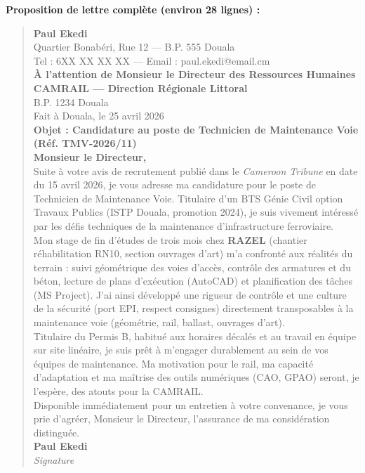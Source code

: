 \documentclass[11pt]{article}
\begin{document}
\begin{corrige}
\textbf{Proposition de lettre complète (environ 28 lignes) :}
\begin{quote}
\textbf{Paul Ekedi} \\
Quartier Bonabéri, Rue 12 — B.P. 555 Douala \\
Tel : 6XX XX XX XX — Email : paul.ekedi@email.cm \\[0.5em]
\textbf{À l'attention de Monsieur le Directeur des Ressources Humaines} \\
\textbf{CAMRAIL — Direction Régionale Littoral} \\
B.P. 1234 Douala \\[0.5em]
Fait à Douala, le 25 avril 2026 \\[0.5em]
\textbf{Objet : Candidature au poste de Technicien de Maintenance Voie (Réf. TMV-2026/11)} \\[0.5em]
\textbf{Monsieur le Directeur,} \\[0.5em]
Suite à votre avis de recrutement publié dans le \emph{Cameroon Tribune} en date du 15 avril 2026, je vous adresse ma candidature pour le poste de Technicien de Maintenance Voie. Titulaire d'un BTS Génie Civil option Travaux Publics (ISTP Douala, promotion 2024), je suis vivement intéressé par les défis techniques de la maintenance d'infrastructure ferroviaire. \\[0.5em]
Mon stage de fin d'études de trois mois chez \textbf{RAZEL} (chantier réhabilitation RN10, section ouvrages d'art) m'a confronté aux réalités du terrain : suivi géométrique des voies d'accès, contrôle des armatures et du béton, lecture de plans d'exécution (AutoCAD) et planification des tâches (MS Project). J'ai ainsi développé une rigueur de contrôle et une culture de la sécurité (port EPI, respect consignes) directement transposables à la maintenance voie (géométrie, rail, ballast, ouvrages d'art). \\[0.5em]
Titulaire du Permis B, habitué aux horaires décalés et au travail en équipe sur site linéaire, je suis prêt à m'engager durablement au sein de vos équipes de maintenance. Ma motivation pour le rail, ma capacité d'adaptation et ma maîtrise des outils numériques (CAO, GPAO) seront, je l'espère, des atouts pour la CAMRAIL. \\[0.5em]
Disponible immédiatement pour un entretien à votre convenance, je vous prie d'agréer, Monsieur le Directeur, l'assurance de ma considération distinguée. \\[1em]
\textbf{Paul Ekedi} \\
\textit{Signature}
\end{quote}


\end{corrige}
\end{document}
